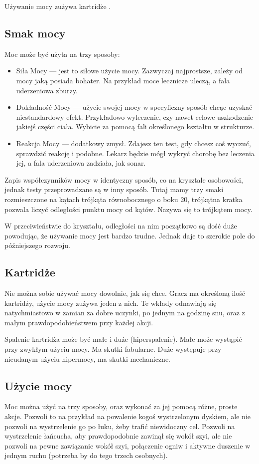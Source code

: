 Używanie mocy zużywa kartridże \abkar{}.

\subsection{Smak mocy}
Moc może być użyta na trzy sposoby:
\begin{itemize}
 \item Siła Mocy \absm{} --- jest to siłowe użycie mocy. Zazwyczaj najprostsze, zależy od mocy jaką posiada bohater. Na przykład moce lecznicze uleczą, a fala uderzeniowa zburzy.
 \item Dokładność Mocy \abdm{} --- użycie swojej mocy w specyficzny sposób chcąc uzyskać niestandardowy efekt. Przykładowo wyleczenie, czy nawet celowe uszkodzenie jakiejś części ciała. Wybicie za pomocą fali określonego kształtu w strukturze.
 \item Reakcja Mocy \abrm{} --- dodatkowy zmysł. Zdajesz ten test, gdy chcesz coś wyczuć, sprawdzić reakcję i podobne. Lekarz będzie mógł wykryć chorobę bez leczenia jej, a fala uderzeniowa zadziała, jak sonar.
\end{itemize}

Zapis współczynników mocy w identyczny sposób, co na krysztale osobowości, jednak testy przeprowadzane są w inny sposób.
Tutaj mamy trzy smaki rozmieszczone na kątach trójkąta równobocznego o boku 20, trójkątna kratka pozwala liczyć odległości punktu mocy od kątów.
Nazywa się to trójkątem mocy.

W przeciwieństwie do kryształu, odległości na nim początkowo są dość duże powodując, że używanie mocy jest bardzo trudne.
Jednak daje to szerokie pole do późniejszego rozwoju.

\subsection{Kartridże}
Nie można sobie używać mocy dowolnie, jak się chce.
Gracz ma określoną ilość kartridży, użycie mocy zużywa jeden z nich.
Te wkłady odnawiają się natychmiastowo w zamian za dobre uczynki, po jednym na godzinę snu, oraz z małym prawdopodobieństwem przy każdej akcji.

Spalenie kartridża może być małe i duże (hiperspalenie).
Małe może wystąpić przy zwykłym użyciu mocy. Ma skutki fabularne.
Duże występuje przy nieudanym użyciu hipermocy, ma skutki mechaniczne.

\subsection{Użycie mocy}
Moc można użyć na trzy sposoby, oraz wykonać za jej pomocą różne, proste akcje.
Pozwoli to na przykład na powalenie kogoś wystrzelonym dyskiem, ale nie pozwoli na wystrzelenie go po łuku, żeby trafić niewidoczny cel.
Pozwoli na wystrzelenie łańcucha, aby prawdopodobnie zawinął się wokół szyi, ale nie pozwoli na pewne zawiązanie wokół szyi, połączenie ogniw i aktywne duszenie w jednym ruchu (potrzeba by do tego trzech osobnych).

